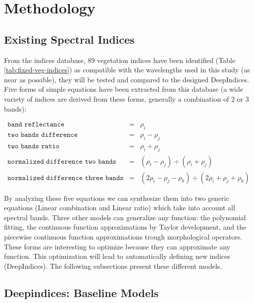 \documentclass[../thesis.tex]{subfiles}
\begin{document}
	\section{Methodology}
	\label{sec:methodology}
	
	
	\subsection{Existing Spectral Indices}
	From the indices database, 89 vegetation indices have been identified (Table \ref{tab:fixed-veg-indices}) as compatible with the wavelengths used in this study (as near as possible), they will be tested and compared to the designed DeepIndices. Five forms of simple equations have been extracted from this database (a wide variety of indices are derived from these forms, generally a combination of 2 or 3 bands):
	
	\begin{eqnarray}
		\texttt{band reflectance} &=& \rho_i \label{eqn:band_reflectances} \\
		\texttt{two bands difference} &=& \rho_i - \rho_j \label{eqn:two_bands_difference} \\
		\texttt{two bands ratio} &=& \rho_i \div \rho_j  \label{eqn:two_bands_ratio} \\
		\texttt{normalized difference two bands} &=& (\rho_i - \rho_j) \div (\rho_i + \rho_j)  \label{eqn:normalized_difference_two_band} \\
		\texttt{normalized difference three bands} &=& (2\rho_i - \rho_j - \rho_k) \div (2\rho_i + \rho_j + \rho_k)  \label{eqn:normalized difference_three_band}
	\end{eqnarray}
	
	By analyzing these five equations we can synthesize them into two generic equations (Linear combination and Linear ratio) which take into account all spectral bands. Three other models can generalize any function: the polynomial fitting, the continuous function approximations by Taylor development, and the piecewise continuous function approximations trough morphological operators. These forms are interesting to optimize because they can approximate any function. This optimization will lead to automatically defining new indices (DeepIndices). The following subsections present these different models.
	
	\subsection{Deepindices: Baseline Models}
	\label{sec:gen-eqn}
	
\end{document}
